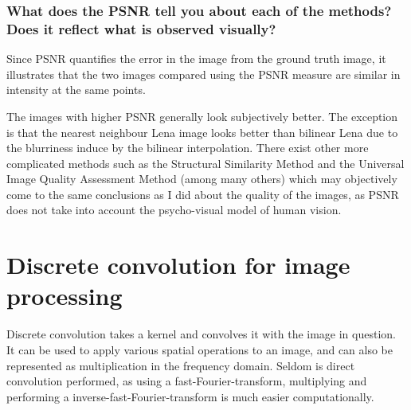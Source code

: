 \documentclass[article, 1.5space, letterpaper, 12pt, oneside, header, footer]{SydeClass}
\begin{document}
\subsubsection{What does the PSNR tell you about each of the methods? Does it reflect what is observed visually?}

Since PSNR quantifies the error in the image from the ground truth image, it illustrates that the two images compared using the PSNR measure are similar in intensity at the same points.

The images with higher PSNR generally look subjectively better. The exception is that the nearest neighbour Lena image looks better than bilinear Lena due to the blurriness induce by the bilinear interpolation. There exist other more complicated methods such as the Structural Similarity Method \cite{ssim-image-qual} and the Universal Image Quality Assessment Method \cite{universal-image-qual} (among many others) which may objectively come to the same conclusions as I did about the quality of the images, as PSNR does not take into account the psycho-visual model of human vision.


\clearpage
\section{Discrete convolution for image processing}

Discrete convolution takes a kernel and convolves it with the image in question. It can be used to apply various spatial operations to an image, and can also be represented as multiplication in the frequency domain. Seldom is direct convolution performed, as using a fast-Fourier-transform, multiplying and performing a inverse-fast-Fourier-transform is much easier computationally.
\end{document}
